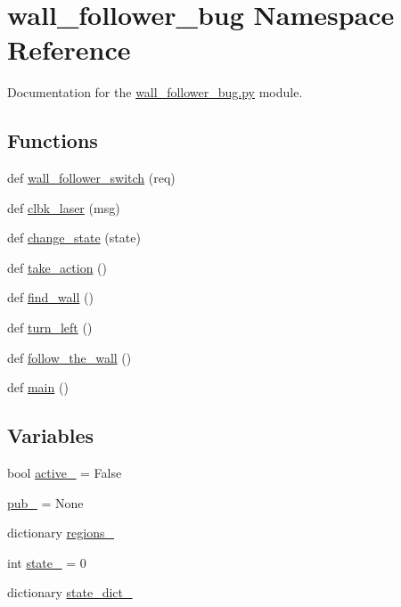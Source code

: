 \hypertarget{namespacewall__follower__bug}{}\section{wall\+\_\+follower\+\_\+bug Namespace Reference}
\label{namespacewall__follower__bug}


Documentation for the \hyperlink{wall__follower__bug_8py}{wall\+\_\+follower\+\_\+bug.\+py} module.  


\subsection*{Functions}
\begin{DoxyCompactItemize}
\item 
def \hyperlink{namespacewall__follower__bug_a5d0c2e78758008504a9749cab054fbd0}{wall\+\_\+follower\+\_\+switch} (req)
\item 
def \hyperlink{namespacewall__follower__bug_aa2ca4880ece52422950bb42e57017f06}{clbk\+\_\+laser} (msg)
\item 
def \hyperlink{namespacewall__follower__bug_af28c29694a6ed8d452c60419577f90c9}{change\+\_\+state} (state)
\item 
def \hyperlink{namespacewall__follower__bug_a500d9cb441c3d49d1e5f5820c8c9b19c}{take\+\_\+action} ()
\item 
def \hyperlink{namespacewall__follower__bug_af945cfe3d9481312d764046030fbc5dd}{find\+\_\+wall} ()
\item 
def \hyperlink{namespacewall__follower__bug_a8c6b06f54645f2626d5b4c79b5af5451}{turn\+\_\+left} ()
\item 
def \hyperlink{namespacewall__follower__bug_af3fec46bbe697b382dc6522a21cab3ed}{follow\+\_\+the\+\_\+wall} ()
\item 
def \hyperlink{namespacewall__follower__bug_acb9b0b720d2f5af0831f00f23d676476}{main} ()
\end{DoxyCompactItemize}
\subsection*{Variables}
\begin{DoxyCompactItemize}
\item 
bool \hyperlink{namespacewall__follower__bug_aae52d8b35c7f252ef4da619eb924a1eb}{active\+\_\+} = False
\item 
\hyperlink{namespacewall__follower__bug_af857c0a3244763f5e201f37452696767}{pub\+\_\+} = None
\item 
dictionary \hyperlink{namespacewall__follower__bug_acb8af6367eac655a9899a840a3c89eae}{regions\+\_\+}
\item 
int \hyperlink{namespacewall__follower__bug_a867cf414a3d42354a718497573927c3f}{state\+\_\+} = 0
\item 
dictionary \hyperlink{namespacewall__follower__bug_ac57f08afcea951e9b48786db2bda0516}{state\+\_\+dict\+\_\+}
\end{DoxyCompactItemize}


